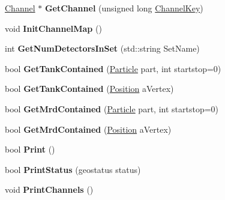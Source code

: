 \begin{DoxyCompactItemize}
\item 
\hypertarget{classGeometry_a68873d502689bb73337c3f8d6e0ef3bf}{\hyperlink{classChannel}{Channel} $\ast$ {\bfseries Get\-Channel} (unsigned long \hyperlink{classChannelKey}{Channel\-Key})}\label{classGeometry_a68873d502689bb73337c3f8d6e0ef3bf}

\item 
\hypertarget{classGeometry_a60e84520417769401492de9e182636fc}{void {\bfseries Init\-Channel\-Map} ()}\label{classGeometry_a60e84520417769401492de9e182636fc}

\item 
\hypertarget{classGeometry_a4354935089665d2856b9a9a5bb1f181a}{int {\bfseries Get\-Num\-Detectors\-In\-Set} (std\-::string Set\-Name)}\label{classGeometry_a4354935089665d2856b9a9a5bb1f181a}

\item 
\hypertarget{classGeometry_aca1dd1c2919c14b2d8bdf40db23c5ba9}{bool {\bfseries Get\-Tank\-Contained} (\hyperlink{classParticle}{Particle} part, int startstop=0)}\label{classGeometry_aca1dd1c2919c14b2d8bdf40db23c5ba9}

\item 
\hypertarget{classGeometry_a2c68539bcaaf45158dbcdc50c3f65ca6}{bool {\bfseries Get\-Tank\-Contained} (\hyperlink{classPosition}{Position} a\-Vertex)}\label{classGeometry_a2c68539bcaaf45158dbcdc50c3f65ca6}

\item 
\hypertarget{classGeometry_af4c8b8f5df92cf905e0ea7098ceb52ed}{bool {\bfseries Get\-Mrd\-Contained} (\hyperlink{classParticle}{Particle} part, int startstop=0)}\label{classGeometry_af4c8b8f5df92cf905e0ea7098ceb52ed}

\item 
\hypertarget{classGeometry_a9da73da227027f3592e9ef10cb06033f}{bool {\bfseries Get\-Mrd\-Contained} (\hyperlink{classPosition}{Position} a\-Vertex)}\label{classGeometry_a9da73da227027f3592e9ef10cb06033f}

\item 
\hypertarget{classGeometry_a5ddd7d7d95f76d8d711c9727824020ca}{bool {\bfseries Print} ()}\label{classGeometry_a5ddd7d7d95f76d8d711c9727824020ca}

\item 
\hypertarget{classGeometry_acf8cf2161abe0c73a4f285f66277f2cd}{bool {\bfseries Print\-Status} (geostatus status)}\label{classGeometry_acf8cf2161abe0c73a4f285f66277f2cd}

\item 
\hypertarget{classGeometry_a12b34f2e75cdee8441008d9de7e2eb1b}{void {\bfseries Print\-Channels} ()}\label{classGeometry_a12b34f2e75cdee8441008d9de7e2eb1b}


\end{DoxyCompactItemize}
